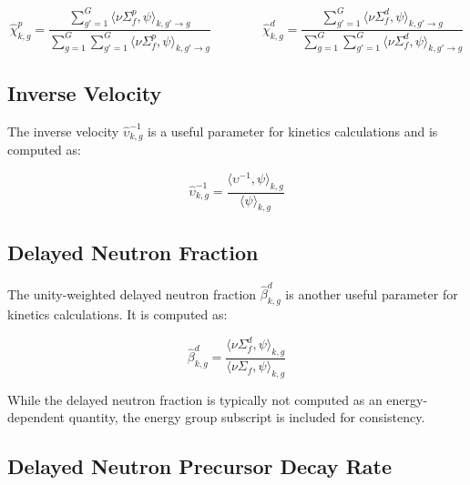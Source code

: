 \begin{equation}
\label{eqn:chi-specific}
\hat{\chi}_{k,g}^{p} = \frac{\displaystyle\sum\limits_{g'=1}^{G} \langle \nu\Sigma_{f}^{p}, \psi \rangle_{k,g'\rightarrow g}}{\displaystyle\sum\limits_{g=1}^{G} \displaystyle\sum\limits_{g'=1}^{G} \langle \nu\Sigma_{f}^{p}, \psi \rangle_{k,g'\rightarrow g}} \qquad \qquad \hat{\chi}_{k,g}^{d} = \frac{\displaystyle\sum\limits_{g'=1}^{G} \langle \nu\Sigma_{f}^{d}, \psi \rangle_{k,g'\rightarrow g}}{\displaystyle\sum\limits_{g=1}^{G} \displaystyle\sum\limits_{g'=1}^{G} \langle \nu\Sigma_{f}^{d}, \psi \rangle_{k,g'\rightarrow g}}
\end{equation}

\subsection{Inverse Velocity}
\label{subsubsec:tally-types-inv-vel}

The inverse velocity $\hat{\upsilon}_{k,g}^{-1}$ is a useful parameter for kinetics calculations and is computed as:

\begin{equation}
\label{eqn:inverse-velocity}
\hat{\upsilon}_{k,g}^{-1} = \frac{\langle \upsilon^{-1}, \psi \rangle_{k,g}}{\langle \psi \rangle_{k,g}}
\end{equation}

\subsection{Delayed Neutron Fraction}
\label{subsubsec:tally-types-beta}

The unity-weighted delayed neutron fraction $\hat{\beta}_{k,g}^{d}$ is another useful parameter for kinetics calculations. It is computed as:

\begin{equation}
\label{eqn:beta}
\hat{\beta}_{k,g}^{d} = \frac{\langle \nu \Sigma_f^d, \psi \rangle_{k,g}}{\langle \nu \Sigma_f, \psi \rangle_{k,g}}
\end{equation}

\noindent While the delayed neutron fraction is typically not computed as an energy-dependent quantity, the energy group subscript is included for consistency.

\subsection{Delayed Neutron Precursor Decay Rate}
\label{subsubsec:tally-types-lambda}

